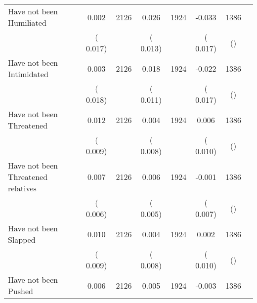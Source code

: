 \begin{tabular}{l*{6}{c}}
Have not been Humiliated        &              0.002      &       2126       &              0.026      &       1924       &             -0.033      &       1386  &  &              \\
                       &       (       0.017)            &                               &       (       0.013)            &                               &       (       0.017)            &       () &                  \\
Have not been Intimidated        &              0.003      &       2126       &              0.018      &       1924       &             -0.022      &       1386  &  &              \\
                       &       (       0.018)            &                               &       (       0.011)            &                               &       (       0.017)            &       () &                  \\
Have not been Threatened        &              0.012      &       2126       &              0.004      &       1924       &              0.006      &       1386  &  &              \\
                       &       (       0.009)            &                               &       (       0.008)            &                               &       (       0.010)            &       () &                  \\
Have not been Threatened relatives        &              0.007      &       2126       &              0.006      &       1924       &             -0.001      &       1386  &  &              \\
                       &       (       0.006)            &                               &       (       0.005)            &                               &       (       0.007)            &       () &                  \\
Have not been Slapped        &              0.010      &       2126       &              0.004      &       1924       &              0.002      &       1386  &  &              \\
                       &       (       0.009)            &                               &       (       0.008)            &                               &       (       0.010)            &       () &                  \\
Have not been Pushed        &              0.006      &       2126       &              0.005      &       1924       &             -0.003      &       1386  &  &              \\

\end{tabular}
